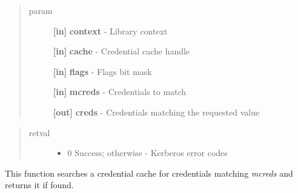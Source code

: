 \documentclass[letterpaper,10pt,english]{sphinxmanual}
\begin{document}
\begin{fulllineitems}
\label{appdev/refs/api/krb5_cc_retrieve_cred:krb5_cc_retrieve_cred}
\end{fulllineitems}

\begin{quote}\begin{description}
\item[{param}] \leavevmode
\textbf{{[}in{]}} \textbf{context} - Library context

\textbf{{[}in{]}} \textbf{cache} - Credential cache handle

\textbf{{[}in{]}} \textbf{flags} - Flags bit mask

\textbf{{[}in{]}} \textbf{mcreds} - Credentials to match

\textbf{{[}out{]}} \textbf{creds} - Credentials matching the requested value

\end{description}\end{quote}
\begin{quote}\begin{description}
\item[{retval}] \leavevmode\begin{itemize}
\item {} 
0   Success; otherwise - Kerberos error codes

\end{itemize}

\end{description}\end{quote}

This function searches a credential cache for credentials matching \emph{mcreds} and returns it if found.
\end{document}
